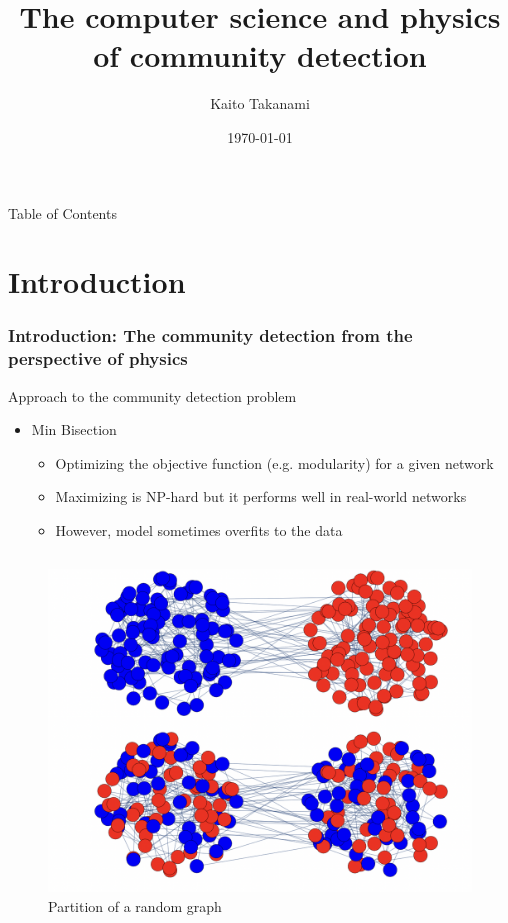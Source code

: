 \documentclass[dvipdfmx,11pt]{beamer}
\title{The computer science and physics of community detection}
\author{Kaito Takanami}
\date{\today}
\institute{School of Science, The University of Tokyo}
\begin{document}
\maketitle

\begin{frame}{Table of Contents}
  \tableofcontents
\end{frame}


\section{Introduction}

\begin{frame}
  \frametitle{Introduction: The community detection from the perspective of physics}

  Approach to the community detection problem
  \begin{itemize}
    \item Min Bisection
    \begin{itemize}
      \item Optimizing the objective function (e.g. modularity) for a given network
      \item Maximizing is NP-hard but it performs well in real-world networks
      \item However, model sometimes overfits to the data 
    \end{itemize}

  \end{itemize}

    \begin{columns}
      \begin{column}{0.4\textwidth}
        \begin{figure}
          \centering
          \includegraphics[width=0.8\linewidth]{figure/overfit.png}
          \caption{Partition of a random graph}
        \end{figure}
      \end{column}
  

\end{columns}
\end{frame}
\end{document}
